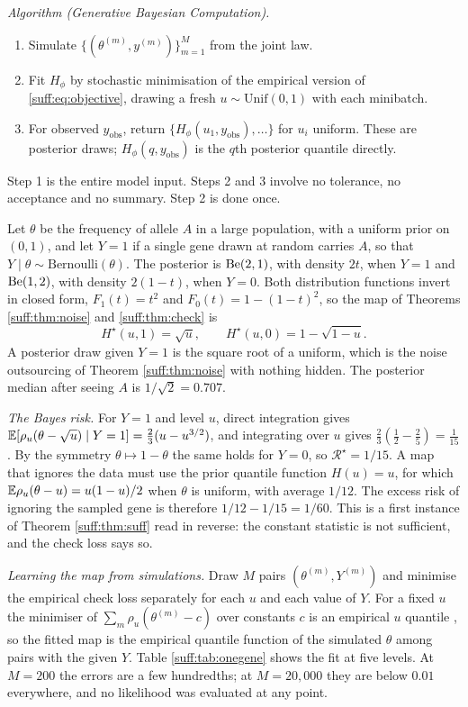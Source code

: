 \medskip
\noindent\emph{Algorithm (Generative Bayesian Computation).}
\begin{enumerate}[leftmargin=1.8em,itemsep=1pt]
\item Simulate $\{(\theta^{(m)},y^{(m)})\}_{m=1}^M$ from the joint law.
\item Fit $H_\phi$ by stochastic minimisation of the empirical version of
\eqref{suff:eq:objective}, drawing a fresh $u\sim\mathrm{Unif}(0,1)$ with each minibatch.
\item For observed $y_{\mathrm{obs}}$, return $\{H_\phi(u_1,y_{\mathrm{obs}}),\dots\}$ for
$u_i$ uniform. These are posterior draws; $H_\phi(q,y_{\mathrm{obs}})$ is the $q$th
posterior quantile directly.
\end{enumerate}

Step 1 is the entire model input. Steps 2 and 3 involve no tolerance, no acceptance and no
summary. Step 2 is done once.

\begin{example}
\label{suff:ex:onegene}
Let $\theta$ be the frequency of allele $A$ in a large population, with a uniform prior on
$(0,1)$, and let $Y=1$ if a single gene drawn at random carries $A$, so that
$Y\mid\theta\sim\mathrm{Bernoulli}(\theta)$. The posterior is $\mathrm{Be}(2,1)$, with density $2t$,
when $Y=1$ and $\mathrm{Be}(1,2)$, with density $2(1-t)$, when $Y=0$. Both distribution functions
invert in closed form, $F_1(t)=t^2$ and $F_0(t)=1-(1-t)^2$, so the map of Theorems
\ref{suff:thm:noise} and \ref{suff:thm:check} is
\[
H^\star(u,1)=\sqrt u,\qquad H^\star(u,0)=1-\sqrt{1-u}.
\]
A posterior draw given $Y=1$ is the square root of a uniform, which is the noise outsourcing
of Theorem \ref{suff:thm:noise} with nothing hidden. The posterior median after seeing $A$ is
$1/\sqrt2=0.707$.

\emph{The Bayes risk.} For $Y=1$ and level $u$, direct integration gives
$\mathbb{E}[\rho_u(\theta-\sqrt u)\mid Y=1]=\tfrac23(u-u^{3/2})$, and integrating over $u$ gives
$\tfrac23(\tfrac12-\tfrac25)=\tfrac1{15}$. By the symmetry $\theta\mapsto1-\theta$ the same
holds for $Y=0$, so $\mathcal{R}^\star=1/15$. A map that ignores the data must use the prior
quantile function $H(u)=u$, for which $\mathbb{E}\rho_u(\theta-u)=u(1-u)/2$ when $\theta$ is
uniform, with average $1/12$. The excess risk of ignoring the sampled gene is therefore
$1/12-1/15=1/60$. This is a first instance of Theorem \ref{suff:thm:suff} read in reverse:
the constant statistic is not sufficient, and the check loss says so.

\emph{Learning the map from simulations.} Draw $M$ pairs $(\theta^{(m)},Y^{(m)})$ and minimise
the empirical check loss separately for each $u$ and each value of $Y$. For a fixed $u$ the
minimiser of $\sum_m\rho_u(\theta^{(m)}-c)$ over constants $c$ is an empirical $u$ quantile
\citep{suff:koenkerbassett1978}, so the fitted map is the empirical quantile function of the
simulated $\theta$ among pairs with the given $Y$. Table \ref{suff:tab:onegene} shows the fit
at five levels. At $M=200$ the errors are a few hundredths; at $M=20{,}000$ they are below
$0.01$ everywhere, and no likelihood was evaluated at any point.
\end{example}

